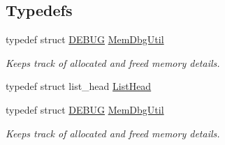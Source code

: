 \subsection*{Typedefs}
\begin{DoxyCompactItemize}
\item 
\hypertarget{group__LIBHELP_ga43233afd4834731532bc5411f87448a9}{typedef struct \hyperlink{structDEBUG}{D\-E\-B\-U\-G} \hyperlink{group__LIBHELP_ga43233afd4834731532bc5411f87448a9}{Mem\-Dbg\-Util}}\label{group__LIBHELP_ga43233afd4834731532bc5411f87448a9}

\begin{DoxyCompactList}\small\item\em Keeps track of allocated and freed memory details. \end{DoxyCompactList}\item 
typedef struct list\-\_\-head \hyperlink{group__LIBHELP_ga73f73d414f252ff46652f16495641187}{List\-Head}
\item 
\hypertarget{group__LIBHELP_ga43233afd4834731532bc5411f87448a9}{typedef struct \hyperlink{structDEBUG}{D\-E\-B\-U\-G} \hyperlink{group__LIBHELP_ga43233afd4834731532bc5411f87448a9}{Mem\-Dbg\-Util}}\label{group__LIBHELP_ga43233afd4834731532bc5411f87448a9}

\begin{DoxyCompactList}\small\item\em Keeps track of allocated and freed memory details. \end{DoxyCompactList}\end{DoxyCompactItemize}
